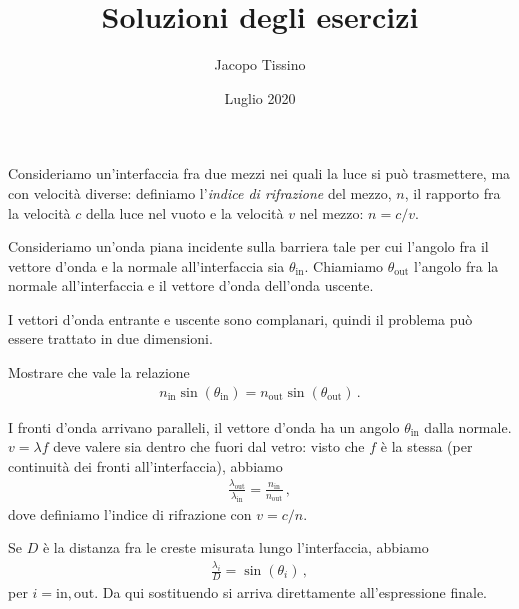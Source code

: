 \documentclass[a4paper,12pt]{article}
\author{Jacopo Tissino}
\title{Soluzioni degli esercizi}
\date{Luglio 2020}
\begin{document}
\maketitle

\begin{exo}
Consideriamo un'interfaccia fra due mezzi nei quali la luce si può trasmettere, ma con velocità diverse: definiamo l'\emph{indice di rifrazione} del mezzo, \(n\), il rapporto fra la velocità \(c\) della luce nel vuoto e la velocità \(v\) nel mezzo: \(n = c/v\).

Consideriamo un'onda piana incidente sulla barriera tale per cui l'angolo fra il vettore d'onda e la normale all'interfaccia sia \(\theta _{\text{in}}\). 
Chiamiamo \(\theta _{\text{out}}\) l'angolo fra la normale all'interfaccia e il vettore d'onda dell'onda uscente. 

I vettori d'onda entrante e uscente sono complanari, quindi il problema può essere trattato in due dimensioni.

Mostrare che vale la relazione 
%
\begin{align}
n _{\text{in}} \sin(\theta _{\text{in}}) = 
n _{\text{out}} \sin(\theta _{\text{out}})
\,.
\end{align}
\end{exo}

I fronti d'onda arrivano paralleli, il vettore d'onda ha un angolo \(\theta _{\text{in}}\) dalla normale. \(v = \lambda f\) deve valere sia dentro che fuori dal vetro: visto che \(f\) è la stessa (per continuità dei fronti all'interfaccia), abbiamo 
%
\begin{align}
    \frac{ \lambda _{\text{out}}}{\lambda _{\text{in}}} = \frac{n _{\text{in}}}{n _{\text{out}}}
    \,,
\end{align}
%
dove definiamo l'indice di rifrazione con \(v = c/n\). 
    
Se \(D\) è la distanza fra le creste misurata lungo l'interfaccia, abbiamo 
%
\begin{align}
    \frac{\lambda_{i}}{D} = \sin(\theta_{i})
    \,,
\end{align}
%
per \(i = \text{in}, \text{out}\). 
Da qui sostituendo si arriva direttamente all'espressione finale. 
\end{document}
